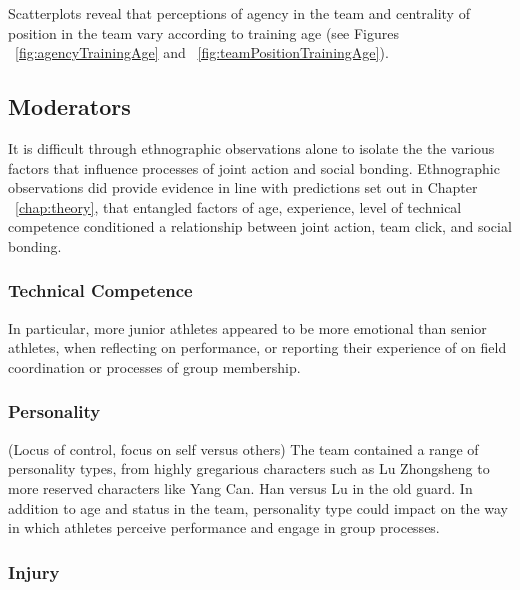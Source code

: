 \begin{CJK}{UTF8}{gbsn}
Scatterplots reveal that perceptions of agency in the team and centrality of position in the team vary according to training age (see Figures ~\ref{fig:agencyTrainingAge} and ~\ref{fig:teamPositionTrainingAge}).




\clearpage




\subsection{Moderators\label{sect:mods}}

It is difficult through ethnographic observations alone to isolate the the various factors that influence processes of joint action and social bonding.  Ethnographic observations did provide evidence in line with predictions set out in Chapter ~\ref{chap:theory}, that entangled factors of age, experience, level of technical competence conditioned a relationship between joint action, team click, and social bonding.

        \subsubsection{Technical Competence}

In particular, more junior athletes appeared to be more emotional than senior athletes, when reflecting on performance, or reporting their experience of on field coordination or processes of group membership.


        \subsubsection{Personality\label{sect:ethnoPersonality}}

(Locus of control, focus on self versus others)
The team contained a range of personality types, from highly gregarious characters such as Lu Zhongsheng to more reserved characters like Yang Can.  Han versus Lu in the old guard.  In addition to age and status in the team, personality type could impact on the way in which athletes perceive performance and engage in group processes.

        \subsubsection{Injury}


\end{CJK}
